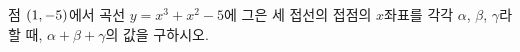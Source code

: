 점 $(1{,}\mkern3mu\mathopen{}-5)$에서 곡선 $y=x^3+x^2-5$에 그은 세 접선의 접점의 $x$좌표를 각각 $\alpha$, $\beta$, $\gamma$라 할 때, $\alpha+\beta+\gamma$의 값을 구하시오.
